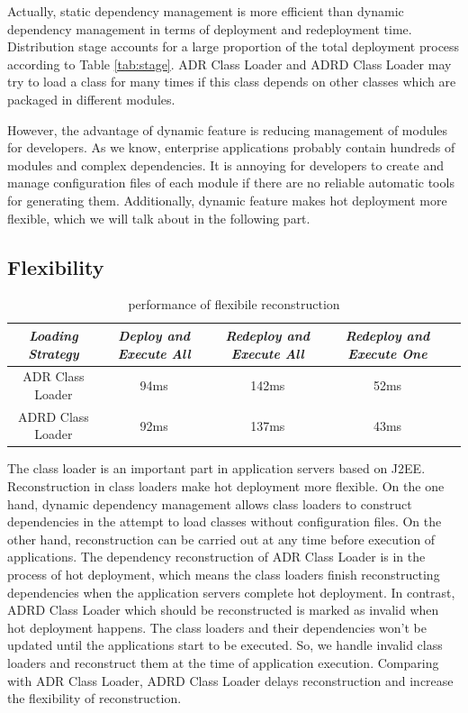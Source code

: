 \documentclass[conference]{IEEEtran}
\begin{document}
Actually, static dependency management is more efficient than dynamic dependency management in terms of deployment and redeployment time.
Distribution stage accounts for a large proportion of the total deployment process according to Table \ref{tab:stage}.
ADR Class Loader and ADRD Class Loader may try to load a class for many times if this class depends on other classes which are packaged in different modules.

However, the advantage of dynamic feature is reducing management of modules for developers.
As we know, enterprise applications probably contain hundreds of modules and complex dependencies.
It is annoying for developers to create and manage configuration files of each module if there are no reliable automatic tools for generating them.
Additionally, dynamic feature makes hot deployment more flexible, which we will talk about in the following part.


\subsection{Flexibility}

\begin{table}
\centering
\caption{performance of flexibile reconstruction}
\label{tab:flexibility}
\begin{tabular}{|c|c|c|c|c|}
\hline
\emph{Loading Strategy}	& \emph{Deploy and Execute All}	& \emph{Redeploy and Execute All} & \emph{Redeploy and Execute One}\\
\hline
\hline
ADR Class Loader 	&	94ms				&	142ms				&	52ms\\
\hline
ADRD Class Loader 	&	92ms				&	137ms				&	43ms\\
\hline
\end{tabular}
\end{table}


The class loader is an important part in application servers based on J2EE.
Reconstruction in class loaders make hot deployment more flexible.
On the one hand, dynamic dependency management allows class loaders to construct dependencies in the attempt to load classes without configuration files.
On the other hand, reconstruction can be carried out at any time before execution of applications.
The dependency reconstruction of ADR Class Loader is in the process of hot deployment, which means the class loaders finish reconstructing dependencies when the application servers complete hot deployment.
In contrast, ADRD Class Loader which should be reconstructed is marked as invalid when hot deployment happens.
The class loaders and their dependencies won't be updated until the applications start to be executed.
So, we handle invalid class loaders and reconstruct them at the time of application execution.
Comparing with ADR Class Loader, ADRD Class Loader delays reconstruction and increase the flexibility of reconstruction.
\end{document}
